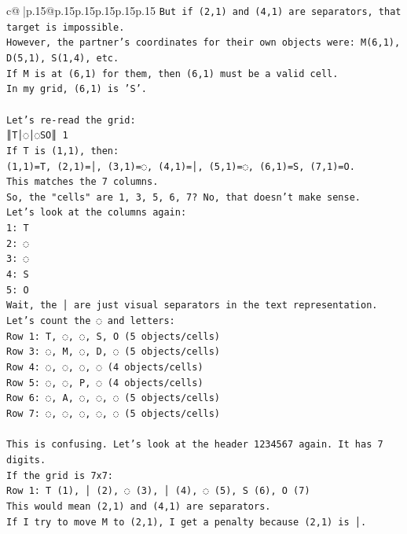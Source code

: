 \documentclass{article}
\begin{document}
{\begin{supertabular}{c@{$\;$}|p{.15\linewidth}@{}p{.15\linewidth}p{.15\linewidth}p{.15\linewidth}p{.15\linewidth}p{.15\linewidth}}
{{{\texttt{But if (2,1) and (4,1) are separators, that target is impossible.} \\
\texttt{However, the partner's coordinates for their own objects were: M(6,1), D(5,1), S(1,4), etc.} \\
\texttt{If M is at (6,1) for them, then (6,1) must be a valid cell.} \\
\texttt{In my grid, (6,1) is 'S'.} \\
\\ 
\texttt{Let's re{-}read the grid:} \\
\texttt{║T│◌│◌SO║ 1} \\
\texttt{If T is (1,1), then:} \\
\texttt{(1,1)=T, (2,1)=│, (3,1)=◌, (4,1)=│, (5,1)=◌, (6,1)=S, (7,1)=O.} \\
\texttt{This matches the 7 columns.} \\
\texttt{So, the "cells" are 1, 3, 5, 6, 7? No, that doesn't make sense.} \\
\texttt{Let's look at the columns again:} \\
\texttt{1: T} \\
\texttt{2: ◌} \\
\texttt{3: ◌} \\
\texttt{4: S} \\
\texttt{5: O} \\
\texttt{Wait, the │ are just visual separators in the text representation.} \\
\texttt{Let's count the ◌ and letters:} \\
\texttt{Row 1: T, ◌, ◌, S, O (5 objects/cells)} \\
\texttt{Row 3: ◌, M, ◌, D, ◌ (5 objects/cells)} \\
\texttt{Row 4: ◌, ◌, ◌, ◌ (4 objects/cells)} \\
\texttt{Row 5: ◌, ◌, P, ◌ (4 objects/cells)} \\
\texttt{Row 6: ◌, A, ◌, ◌, ◌ (5 objects/cells)} \\
\texttt{Row 7: ◌, ◌, ◌, ◌, ◌ (5 objects/cells)} \\
\\ 
\texttt{This is confusing. Let's look at the header 1234567 again. It has 7 digits.} \\
\texttt{If the grid is 7x7:} \\
\texttt{Row 1: T (1), │ (2), ◌ (3), │ (4), ◌ (5), S (6), O (7)} \\
\texttt{This would mean (2,1) and (4,1) are separators.} \\
\texttt{If I try to move M to (2,1), I get a penalty because (2,1) is │.} \\
}}}
\end{supertabular}}
\end{document}
